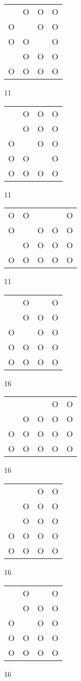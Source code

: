 \begin{tabular}{|m{0.2cm}m{0.2cm}m{0.2cm}m{0.2cm}|}\hline
 &O&O&O\\
O& &O&O\\
O&O& &O\\
 &O&O&O\\
O&O&O&O\\
\hline\end{tabular}11
\begin{tabular}{|m{0.2cm}m{0.2cm}m{0.2cm}m{0.2cm}|}\hline
 &O&O&O\\
 &O&O&O\\
O& &O&O\\
O&O& &O\\
O&O&O&O\\
\hline\end{tabular}11
\begin{tabular}{|m{0.2cm}m{0.2cm}m{0.2cm}m{0.2cm}m{0.2cm}|}\hline
O&O& & &O\\
O& &O&O&O\\
 &O&O&O&O\\
O&O&O&O&O\\
\hline\end{tabular}11
\begin{tabular}{|m{0.2cm}m{0.2cm}m{0.2cm}m{0.2cm}|}\hline
 &O& &O\\
 &O&O&O\\
O& &O&O\\
O&O&O&O\\
O&O&O&O\\
\hline\end{tabular}16
\begin{tabular}{|m{0.2cm}m{0.2cm}m{0.2cm}m{0.2cm}m{0.2cm}|}\hline
 & & &O&O\\
 &O&O&O&O\\
O&O&O&O&O\\
O&O&O&O&O\\
\hline\end{tabular}16
\begin{tabular}{|m{0.2cm}m{0.2cm}m{0.2cm}m{0.2cm}|}\hline
 & &O&O\\
 &O&O&O\\
 &O&O&O\\
O&O&O&O\\
O&O&O&O\\
\hline\end{tabular}16
\begin{tabular}{|m{0.2cm}m{0.2cm}m{0.2cm}m{0.2cm}|}\hline
 &O& &O\\
 &O&O&O\\
O& &O&O\\
O&O&O&O\\
O&O&O&O\\
\hline\end{tabular}16

